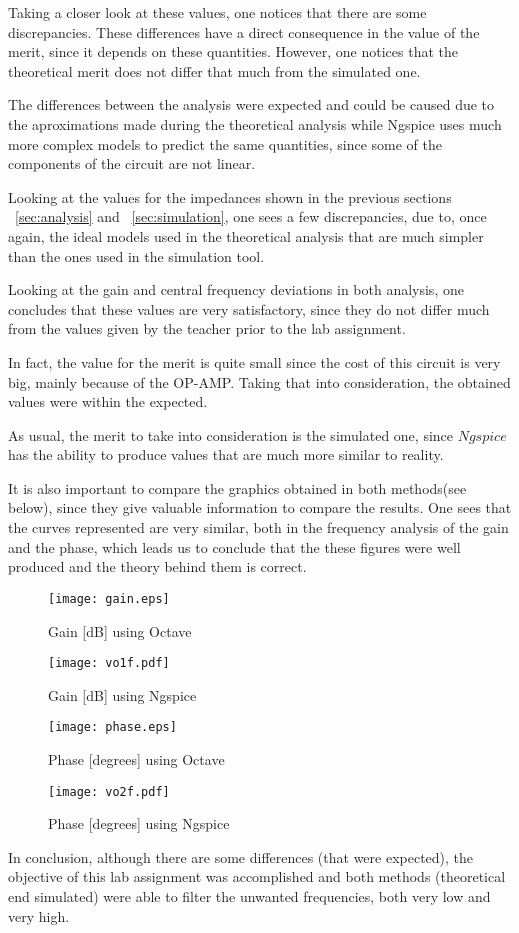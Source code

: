 \par Taking a closer look at these values, one notices that there are some discrepancies. These differences have a direct consequence in the value of the merit, since it depends on these quantities. However, one notices that the theoretical merit does not differ that much from the simulated one. 
\par The differences between the analysis were expected and could be caused due to the aproximations made during the theoretical analysis while Ngspice uses much more complex models to predict the same quantities, since some of the components of the circuit are not linear.
\par Looking at the values for the impedances shown in the previous sections ~\ref{sec:analysis} and ~\ref{sec:simulation}, one sees a few discrepancies, due to, once again, the ideal models used in the theoretical analysis that are much simpler than the ones used in the simulation tool.
\par Looking at the gain and central frequency deviations in both analysis, one concludes that these values are very satisfactory, since they do not differ much from the values given by the teacher prior to the lab assignment.
\par In fact, the value for the merit is quite small since the cost of this circuit is very big, mainly because of the OP-AMP. Taking that into consideration, the obtained values were within the expected.
\par As usual, the merit to take into consideration is the simulated one, since $Ngspice$ has the ability to produce values that are much more similar to reality.
\par It is also important to compare the graphics obtained in both methods(see below), since they give valuable information to compare the results. One sees that the curves represented are very similar, both in the frequency analysis of the gain and the phase, which leads us to conclude that the these figures were well produced and the theory behind them is correct.

\begin{figure}[ht]
\centering
\parbox{.47\linewidth}{
  \centering
  \texttt{[image: gain.eps]}
  \caption{Gain [dB] using Octave}
  \label{fig:matfg} }
\parbox{.47\linewidth}{
  \centering
  \texttt{[image: vo1f.pdf]}
  \caption{Gain [dB] using Ngspice}
  \label{fig:simfg}}
\end{figure}

\begin{figure}[ht]
\centering
\parbox{.47\linewidth}{
  \centering
  \texttt{[image: phase.eps]}
  \caption{Phase [degrees] using Octave}
  \label{fig:matfp} }
\parbox{.47\linewidth}{
  \centering
  \texttt{[image: vo2f.pdf]}
  \caption{Phase [degrees] using Ngspice}
  \label{fig:simfp}}
\end{figure}

\par In conclusion, although there are some differences (that were expected), the objective of this lab assignment was accomplished and both methods (theoretical end simulated) were able to filter the unwanted frequencies, both very low and very high.
